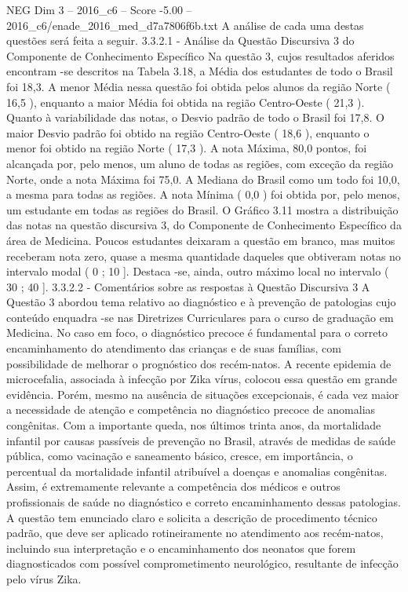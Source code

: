 \begin{textsample}{NEG Dim 3 – 2016\_c6 – Score -5.00 – 2016\_c6/enade\_2016\_med\_d7a7806f6b.txt}
A análise de cada uma destas questões será feita a seguir. 3.3.2.1 - Análise da Questão Discursiva 3 do Componente de Conhecimento Específico Na questão 3, cujos resultados aferidos encontram -se descritos na Tabela 3.18, a Média dos estudantes de todo o Brasil foi 18,3.
A menor Média nessa questão foi obtida pelos alunos da região Norte ( 16,5 ), enquanto a maior Média foi obtida na região Centro-Oeste ( 21,3 ).
Quanto à variabilidade das notas, o Desvio padrão de todo o Brasil foi 17,8.
O maior Desvio padrão foi obtido na região Centro-Oeste ( 18,6 ), enquanto o menor foi obtido na região Norte ( 17,3 ).
A nota Máxima, 80,0 pontos, foi alcançada por, pelo menos, um aluno de todas as regiões, com exceção da região Norte, onde a nota Máxima foi 75,0.
A Mediana do Brasil como um todo foi 10,0, a mesma para todas as regiões.
A nota Mínima ( 0,0 ) foi obtida por, pelo menos, um estudante em todas as regiões do Brasil.
O Gráfico 3.11 mostra a distribuição das notas na questão discursiva 3, do Componente de Conhecimento Específico da área de Medicina.
Poucos estudantes deixaram a questão em branco, mas muitos receberam nota zero, quase a mesma quantidade daqueles que obtiveram notas no intervalo modal ( 0 ; 10 ].
Destaca -se, ainda, outro máximo local no intervalo ( 30 ; 40 ]. 3.3.2.2 - Comentários sobre as respostas à Questão Discursiva 3 A Questão 3 abordou tema relativo ao diagnóstico e à prevenção de patologias cujo conteúdo enquadra -se nas Diretrizes Curriculares para o curso de graduação em Medicina.
No caso em foco, o diagnóstico precoce é fundamental para o correto encaminhamento do atendimento das crianças e de suas famílias, com possibilidade de melhorar o prognóstico dos recém-natos.
A recente epidemia de microcefalia, associada à infecção por Zika vírus, colocou essa questão em grande evidência.
Porém, mesmo na ausência de situações excepcionais, é cada vez maior a necessidade de atenção e competência no diagnóstico precoce de anomalias congênitas.
Com a importante queda, nos últimos trinta anos, da mortalidade infantil por causas passíveis de prevenção no Brasil, através de medidas de saúde pública, como vacinação e saneamento básico, cresce, em importância, o percentual da mortalidade infantil atribuível a doenças e anomalias congênitas.
Assim, é extremamente relevante a competência dos médicos e outros profissionais de saúde no diagnóstico e correto encaminhamento dessas patologias.
A questão tem enunciado claro e solicita a descrição de procedimento técnico padrão, que deve ser aplicado rotineiramente no atendimento aos recém-natos, incluindo sua interpretação e o encaminhamento dos neonatos que forem diagnosticados com possível comprometimento neurológico, resultante de infecção pelo vírus Zika.

\end{textsample}
